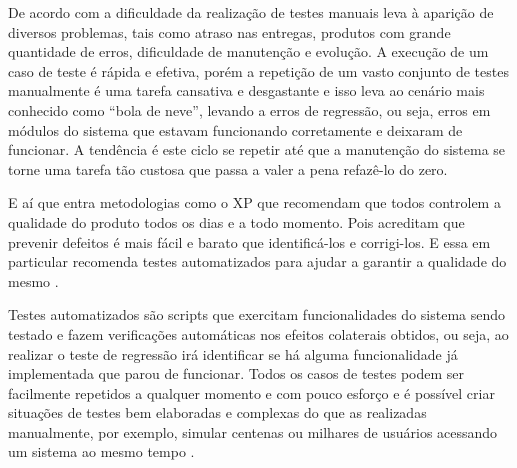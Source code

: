 De acordo com \cite{kon} a dificuldade da realização de testes manuais leva à aparição de diversos problemas, tais como atraso nas entregas, produtos com grande quantidade de erros, dificuldade de manutenção e evolução. A execução de um caso de teste é rápida e efetiva, porém a repetição de um vasto conjunto de testes manualmente é uma tarefa cansativa e desgastante e isso leva ao cenário mais conhecido como “bola de neve”, levando a erros de regressão, ou seja, erros em módulos do sistema que estavam funcionando corretamente e deixaram de funcionar. A tendência é este ciclo se repetir até que a manutenção do sistema se torne uma tarefa tão custosa que passa a valer a pena refazê-lo do zero.

E aí que entra metodologias como o XP que recomendam que todos controlem a qualidade do produto todos os dias e a todo momento. Pois acreditam que prevenir defeitos é mais fácil e barato que identificá-los e corrigi-los. E essa em particular recomenda testes automatizados para ajudar a garantir a qualidade do mesmo \cite{kon}.

Testes automatizados são scripts que exercitam funcionalidades do sistema sendo testado e fazem verificações automáticas nos efeitos colaterais obtidos, ou seja, ao realizar o teste de regressão irá identificar se há alguma funcionalidade já implementada que parou de funcionar. Todos os casos de testes podem ser facilmente repetidos a qualquer momento e com pouco esforço e é possível criar situações de testes bem elaboradas e complexas do que as realizadas manualmente, por exemplo, simular centenas ou milhares de usuários acessando um sistema ao mesmo tempo \cite{kon}.
